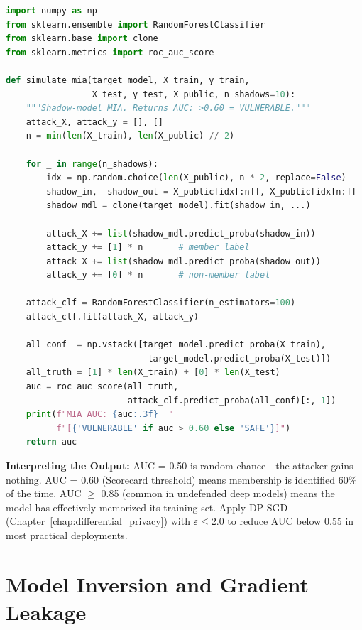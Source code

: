 \begin{lstlisting}[language=Python, style=pythonstyle,
  caption={Simplified Membership Inference Attack simulation. AUC $>0.60$ indicates membership leakage above the Sovereign AI Scorecard threshold; apply DP-SGD with $\varepsilon \leq 2.0$ to reduce it below 0.55 in most practical cases.},
  label={lst:mia_simulation}]
import numpy as np
from sklearn.ensemble import RandomForestClassifier
from sklearn.base import clone
from sklearn.metrics import roc_auc_score

def simulate_mia(target_model, X_train, y_train,
                 X_test, y_test, X_public, n_shadows=10):
    """Shadow-model MIA. Returns AUC: >0.60 = VULNERABLE."""
    attack_X, attack_y = [], []
    n = min(len(X_train), len(X_public) // 2)

    for _ in range(n_shadows):
        idx = np.random.choice(len(X_public), n * 2, replace=False)
        shadow_in,  shadow_out = X_public[idx[:n]], X_public[idx[n:]]
        shadow_mdl = clone(target_model).fit(shadow_in, ...)

        attack_X += list(shadow_mdl.predict_proba(shadow_in))
        attack_y += [1] * n       # member label
        attack_X += list(shadow_mdl.predict_proba(shadow_out))
        attack_y += [0] * n       # non-member label

    attack_clf = RandomForestClassifier(n_estimators=100)
    attack_clf.fit(attack_X, attack_y)

    all_conf  = np.vstack([target_model.predict_proba(X_train),
                            target_model.predict_proba(X_test)])
    all_truth = [1] * len(X_train) + [0] * len(X_test)
    auc = roc_auc_score(all_truth,
                        attack_clf.predict_proba(all_conf)[:, 1])
    print(f"MIA AUC: {auc:.3f}  "
          f"[{'VULNERABLE' if auc > 0.60 else 'SAFE'}]")
    return auc
\end{lstlisting}

\begin{svgraybox}
\textbf{Interpreting the Output:} AUC = 0.50 is random chance---the attacker gains nothing. AUC = 0.60 (Scorecard threshold) means membership is identified 60\% of the time. AUC $\geq$ 0.85 (common in undefended deep models) means the model has effectively memorized its training set. Apply DP-SGD (Chapter~\ref{chap:differential_privacy}) with $\varepsilon \leq 2.0$ to reduce AUC below 0.55 in most practical deployments.
\end{svgraybox}

\section{Model Inversion and Gradient Leakage}
\label{sec:model_inversion}

